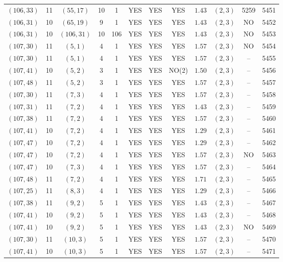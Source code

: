 \begin{longtable}{|c|c|c|c|c|c|c|c|c|c|c|c|}
$(106,33)$ & 11 & $(55,17)$ & 10 & 1 & YES & YES & YES & $1.43$ & $(2,3)$ & 5259 & 5451\\
$(106,31)$ & 10 & $(65,19)$ & 9 & 1 & YES & YES & YES & $1.43$ & $(2,3)$ & NO & 5452\\
$(106,31)$ & 10 & $(106,31)$ & 10 & 106 & YES & YES & YES & $1.43$ & $(2,3)$ & NO & 5453\\
$(107,30)$ & 11 & $(5,1)$ & 4 & 1 & YES & YES & YES & $1.57$ & $(2,3)$ & NO & 5454\\
$(107,30)$ & 11 & $(5,1)$ & 4 & 1 & YES & YES & YES & $1.57$ & $(2,3)$ & -- & 5455\\
$(107,41)$ & 10 & $(5,2)$ & 3 & 1 & YES & YES & NO(2) & $1.50$ & $(2,3)$ & -- & 5456\\
$(107,48)$ & 11 & $(5,2)$ & 3 & 1 & YES & YES & YES & $1.57$ & $(2,3)$ & -- & 5457\\
$(107,30)$ & 11 & $(7,3)$ & 4 & 1 & YES & YES & YES & $1.57$ & $(2,3)$ & -- & 5458\\
$(107,31)$ & 11 & $(7,2)$ & 4 & 1 & YES & YES & YES & $1.43$ & $(2,3)$ & -- & 5459\\
$(107,38)$ & 11 & $(7,2)$ & 4 & 1 & YES & YES & YES & $1.57$ & $(2,3)$ & -- & 5460\\
$(107,41)$ & 10 & $(7,2)$ & 4 & 1 & YES & YES & YES & $1.29$ & $(2,3)$ & -- & 5461\\
$(107,47)$ & 10 & $(7,2)$ & 4 & 1 & YES & YES & YES & $1.29$ & $(2,3)$ & -- & 5462\\
$(107,47)$ & 10 & $(7,2)$ & 4 & 1 & YES & YES & YES & $1.57$ & $(2,3)$ & NO & 5463\\
$(107,47)$ & 10 & $(7,3)$ & 4 & 1 & YES & YES & YES & $1.57$ & $(2,3)$ & -- & 5464\\
$(107,48)$ & 11 & $(7,2)$ & 4 & 1 & YES & YES & YES & $1.71$ & $(2,3)$ & -- & 5465\\
$(107,25)$ & 11 & $(8,3)$ & 4 & 1 & YES & YES & YES & $1.29$ & $(2,3)$ & -- & 5466\\
$(107,38)$ & 11 & $(9,2)$ & 5 & 1 & YES & YES & YES & $1.43$ & $(2,3)$ & -- & 5467\\
$(107,41)$ & 10 & $(9,2)$ & 5 & 1 & YES & YES & YES & $1.43$ & $(2,3)$ & -- & 5468\\
$(107,41)$ & 10 & $(9,2)$ & 5 & 1 & YES & YES & YES & $1.43$ & $(2,3)$ & NO & 5469\\
$(107,30)$ & 11 & $(10,3)$ & 5 & 1 & YES & YES & YES & $1.57$ & $(2,3)$ & -- & 5470\\
$(107,41)$ & 10 & $(10,3)$ & 5 & 1 & YES & YES & YES & $1.57$ & $(2,3)$ & -- & 5471\\

\end{longtable}
